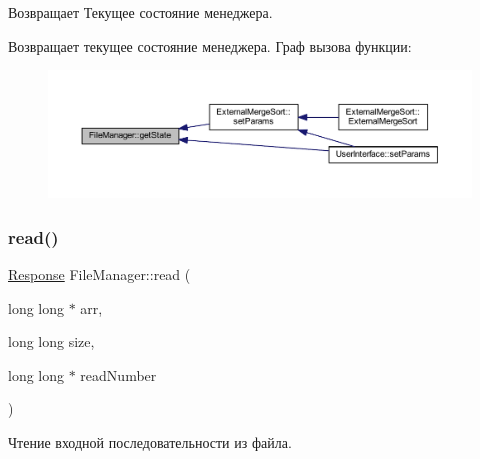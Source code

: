 \begin{DoxyReturn}{Возвращает}
Текущее состояние менеджера.
\end{DoxyReturn}
Возвращает текущее состояние менеджера. Граф вызова функции\+:\nopagebreak
\begin{figure}[H]
\begin{center}
\leavevmode
\includegraphics[width=350pt]{class_file_manager_abd4cbc2b218ab1828ae376a4a9137057_icgraph}
\end{center}
\end{figure}
\hypertarget{class_file_manager_a66fd5270bbc2bd37151c59a713a10abf}{}\label{class_file_manager_a66fd5270bbc2bd37151c59a713a10abf} 
\subsubsection{\texorpdfstring{read()}{read()}}
{\footnotesize\ttfamily \hyperlink{_structures_8h_ab3500e5d3c915d1b5cc58dcab8673fd4}{Response} File\+Manager\+::read (\begin{DoxyParamCaption}\item[{long long $\ast$}]{arr,  }\item[{long long}]{size,  }\item[{long long $\ast$}]{read\+Number }\end{DoxyParamCaption})}



Чтение входной последовательности из файла. 


